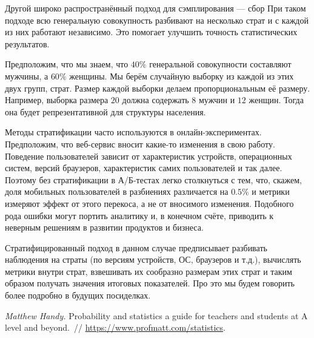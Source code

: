 \documentclass[12pt, a4paper, oneside]{article}
\begin{document}
Другой широко распространённый подход для сэмплирования --- сбор  При таком подходе всю генеральную совокупность разбивают на несколько страт и с каждой из них работают независимо. Это помогает улучшить точность статистических результатов.  

Предположим, что мы знаем, что $40\%$ генеральной совокупности составляют мужчины, а $60\%$ женщины. Мы берём случайную выборку из каждой из этих двух групп, страт. Размер каждой выборки делаем пропорциональным её размеру. Например, выборка размера $20$ должна содержать $8$ мужчин и $12$ женщин. Тогда она будет репрезентативной для структуры населения.

Методы стратификации часто используются в онлайн-экспериментах. Предположим, что веб-сервис вносит какие-то изменения в свою работу. Поведение пользователей зависит от характеристик устройств, операционных систем, версий браузеров, характеристик самих пользователей и так далее. Поэтому без стратификации в А/Б-тестах легко столкнуться с тем, что, скажем, доля мобильных пользователей в разбиениях различается на $0.5\%$ и метрики измеряют эффект от этого перекоса, а не от вносимого изменения. Подобного рода ошибки могут портить аналитику и, в конечном счёте, приводить к неверным решениям в развитии продуктов и бизнеса.

Стратифицированный подход в данном случае предписывает разбивать наблюдения на страты (по версиям устройств, ОС, браузеров и т.д.), вычислять метрики внутри страт, взвешивать их сообразно размерам этих страт и таким образом получать значения итоговых показателей. Про это мы будем говорить более подробно в будущих посиделках. 



\begin{thebibliography}{1}
	\emph{Matthew Handy.}
	Probability and statistics a guide for teachers and students at A level and beyond.~//
	\url{https://www.profmatt.com/statistics}.
\end{thebibliography}
\end{document}

